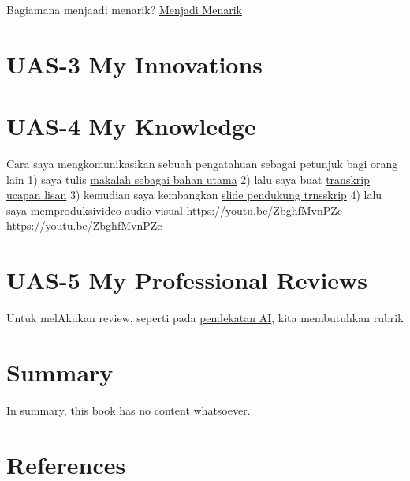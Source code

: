\documentclass[
  letterpaper,
  DIV=11,
  numbers=noendperiod]{scrreprt}
\begin{document}
Bagiamana menjaadi menarik? \href{./Interesting.mp4}{Menjadi Menarik}


\chapter{UAS-3 My Innovations}\label{uas-3-my-innovations}


\chapter{UAS-4 My Knowledge}\label{uas-4-my-knowledge}

Cara saya mengkomunikasikan sebuah pengatahuan sebagai petunjuk bagi
orang lain 1) saya tulis
\href{Rekomendasi\%20Presentasi\%20Efektif(Contoh\%20Makalah).pdf}{makalah
sebagai bahan utama} 2) lalu saya buat
\href{Contoh\%20Transkrip\%20Presentasi.pdf}{transkrip ucapan lisan} 3)
kemudian saya kembangkan
\href{Rekomendasi\%20Presentasi\%20(Contoh\%20Slides).pdf}{slide
pendukung trnsskrip} 4) lalu saya memproduksivideo audio visual
\url{https://youtu.be/ZbghfMvnPZc} \url{https://youtu.be/ZbghfMvnPZc}


\chapter{UAS-5 My Professional
Reviews}\label{uas-5-my-professional-reviews}

Untuk melAkukan review, seperti pada
\href{../My_Personal_Reviews/Doc.5.Mengevaluasi-Esai-Berdasarkan-Rubrik.pdf}{pendekatan
AI}, kita membutuhkan rubrik


\chapter{Summary}\label{summary}

In summary, this book has no content whatsoever.


\chapter*{References}\label{references}


\label{refs}
\end{document}
